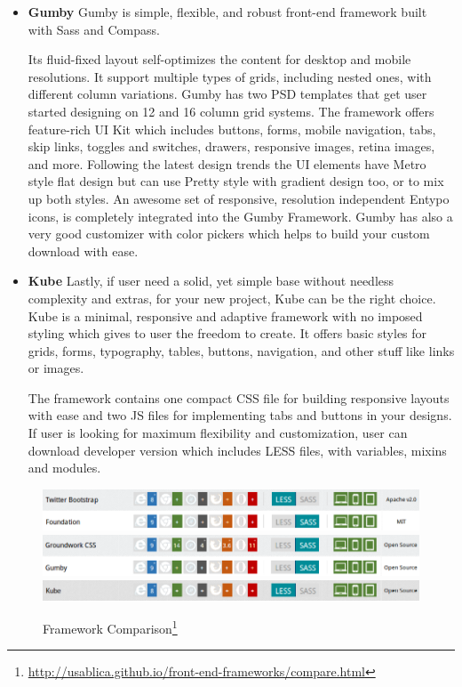 \begin{itemize}
\item \textbf{Gumby}            
\newline
Gumby is simple, flexible, and robust front-end framework built with Sass and Compass.

Its fluid-fixed layout self-optimizes the content for desktop and mobile resolutions. It support multiple types of grids, including nested ones, with different column variations. Gumby has two PSD templates that get user started designing on 12 and 16 column grid systems.
The framework offers feature-rich UI Kit which includes buttons, forms, mobile navigation, tabs, skip links, toggles and switches, drawers, responsive images, retina images, and more. Following the latest design trends the UI elements have Metro style flat design but can use Pretty style with gradient design too, or to mix up both styles. An awesome set of responsive, resolution independent Entypo icons, is completely integrated into the Gumby Framework. Gumby has also a very good customizer with color pickers which helps to build your custom download with ease.
\item \textbf{Kube}
\newline
Lastly, if user need a solid, yet simple base without needless complexity and extras, for your new project, Kube can be the right choice. Kube is a minimal, responsive and adaptive framework with no imposed styling which gives to user the freedom to create. It offers basic styles for grids, forms, typography, tables, buttons, navigation, and other stuff like links or images.

The framework contains one compact CSS file for building responsive layouts with ease and two JS files for implementing tabs and buttons in your designs. If user is looking for maximum flexibility and customization, user can download developer version which includes LESS files, with variables, mixins and modules.
\end{itemize}

\begin{figure}[!ht]
\centering
\includegraphics[scale=0.7]{images/Bootstrap&Foundation.png}
\includegraphics[scale=0.7]{images/Groundwork&Gumby.png} 
\includegraphics[scale=0.7]{images/Kube.png}  
\caption[Framework Comparison]{Framework Comparison\footnote{\url{http://usablica.github.io/front-end-frameworks/compare.html}}}
\label{img:Bootstrap&Foundation.png}
\label{img:Groundwork&Gumby.png}   
\label{img:Kube.png}                          
\end{figure}
